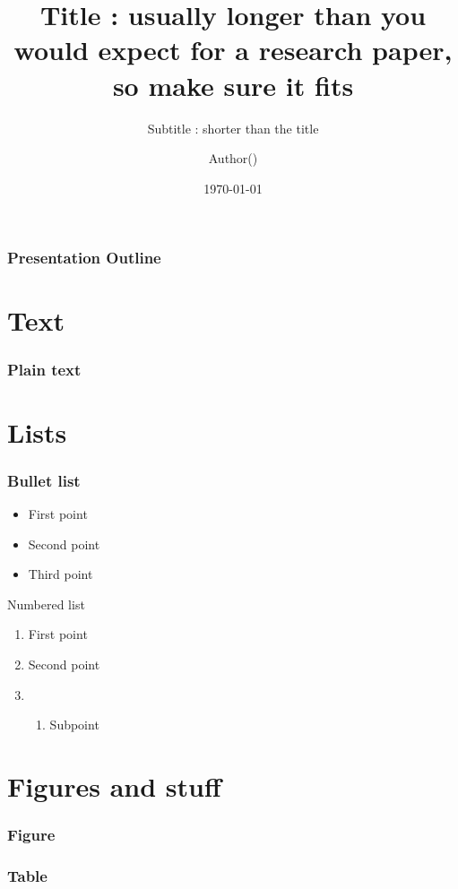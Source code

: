 \documentclass[
	11pt, %
	aspectratio=169, %
]{beamer}
\title{Title : usually longer than you would expect for a research paper, so make sure it fits}
\subtitle{Subtitle : shorter than the title}
\author{Author()}
\institute{ARAMIS Lab}
\date{\today}
\begin{document}

\begin{frame}
	\titlepage %
\end{frame}


\begin{frame}
	\frametitle{Presentation Outline} %
	\tableofcontents %
\end{frame}


\section{Text}

\begin{frame}
  \frametitle{Plain text}

  \lipsum[1][1-5]
  \vfill
  \lipsum[2][1-5]
  \vfill
  \lipsum[3][1-5]

\end{frame}

\section{Lists}

\begin{frame}
  \frametitle{Bullet list}

  \begin{itemize}
    \item First point
    \item Second point
    \item Third point
  \end{itemize} 

\end{frame}

\begin{frame}{Numbered list}
  \begin{enumerate}
    \item First point
    \item Second point
    \item \begin{enumerate}
      \item Subpoint
    \end{enumerate} 
  \end{enumerate}

\end{frame}



\section{Figures and stuff}

\begin{frame}
  \frametitle{Figure}

  

\end{frame}

\begin{frame}
  \frametitle{Table}

  

\end{frame}
\end{document}
